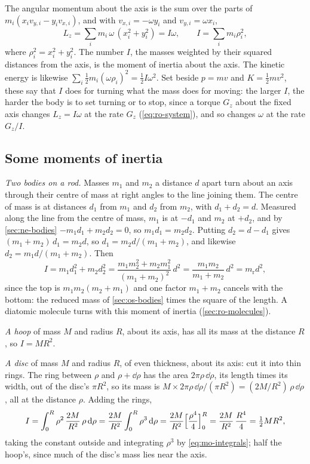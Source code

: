 The angular momentum about the axis is the sum over the parts of
$m_i(x_iv_{y,i} - y_iv_{x,i})$, and with $v_{x,i} = -\omega y_i$ and
$v_{y,i} = \omega x_i$,
\begin{equation}
   L_z = \sum_i m_i\,\omega\,(x_i^2 + y_i^2) = I\omega , \qquad
   I = \sum_i m_i\rho_i^2 ,
   \label{eq:ro-moment}
\end{equation}
where $\rho_i^2 = x_i^2 + y_i^2$. The number $I$, the masses weighted by
their squared distances from the axis, is the moment of inertia about the
axis. The kinetic energy is likewise $\sum_i\frac12 m_i(\omega\rho_i)^2 =
\frac12 I\omega^2$. Set beside $p = mv$ and $K = \frac12 mv^2$, these say
that $I$ does for turning what the mass does for moving: the larger $I$,
the harder the body is to set turning or to stop, since a torque $G_z$
about the fixed axis changes $L_z = I\omega$ at the rate $G_z$
(\cref{eq:ro-system}), and so changes $\omega$ at the rate $G_z/I$.

\subsection*{Some moments of inertia}

\emph{Two bodies on a rod.} Masses $m_1$ and $m_2$ a distance $d$ apart
turn about an axis through their centre of mass at right angles to the
line joining them. The centre of mass is at distances $d_1$ from $m_1$
and $d_2$ from $m_2$, with $d_1 + d_2 = d$. Measured along the line from
the centre of mass, $m_1$ is at $-d_1$ and $m_2$ at $+d_2$, and by
\cref{sec:ne-bodies} $-m_1d_1 + m_2d_2 = 0$, so $m_1d_1 = m_2d_2$.
Putting $d_2 = d - d_1$ gives $(m_1 + m_2)\,d_1 = m_2d$, so $d_1 =
m_2d/(m_1 + m_2)$, and likewise $d_2 = m_1d/(m_1 + m_2)$. Then
\begin{equation}
   I = m_1d_1^2 + m_2d_2^2
   = \frac{m_1m_2^2 + m_2m_1^2}{(m_1 + m_2)^2}\,d^2
   = \frac{m_1m_2}{m_1 + m_2}\,d^2 = m_{\mathrm r}d^2 ,
   \label{eq:ro-dumbbell}
\end{equation}
since the top is $m_1m_2(m_2 + m_1)$ and one factor $m_1 + m_2$ cancels
with the bottom: the reduced mass of
\cref{sec:os-bodies} times the square of the length. A diatomic molecule
turns with this moment of inertia (\cref{sec:ro-molecules}).

\emph{A hoop} of mass $M$ and radius $R$, about its axis, has all its mass
at the distance $R$, so $I = MR^2$.

\emph{A disc} of mass $M$ and radius $R$, of even thickness, about its
axis: cut it into thin rings. The ring between $\rho$ and $\rho + \dd\rho$
has the area $2\pi\rho\,\dd\rho$, its length times its width, out of the
disc's $\pi R^2$, so its mass is $M\times2\pi\rho\,\dd\rho/(\pi R^2) =
(2M/R^2)\,\rho\,\dd\rho$, all at the distance $\rho$. Adding the rings,
\begin{equation*}
   I = \int_0^R\rho^2\,\frac{2M}{R^2}\,\rho\,\mathrm{d}\rho
   = \frac{2M}{R^2}\int_0^R\rho^3\,\mathrm{d}\rho
   = \frac{2M}{R^2}\Bigl[\frac{\rho^4}{4}\Bigr]_0^R
   = \frac{2M}{R^2}\,\frac{R^4}{4} = \tfrac12 MR^2 ,
\end{equation*}
taking the constant outside and integrating $\rho^3$ by
\cref{eq:mo-integrals}; half the hoop's, since much of the disc's mass lies near the axis.

